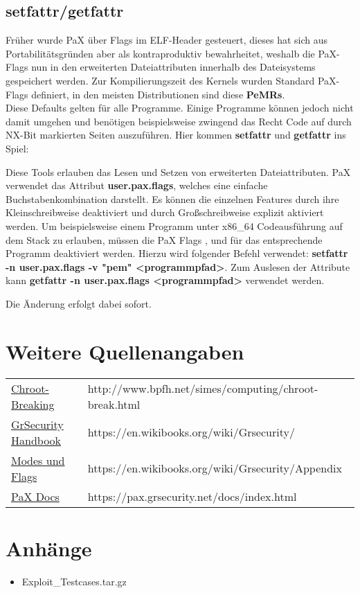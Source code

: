 \subsection{setfattr/getfattr}
\label{subsec:setfattr-getfattr}
Früher wurde PaX über Flags im ELF-Header gesteuert, dieses hat sich aus Portabilitätsgründen aber als kontraproduktiv bewahrheitet, weshalb die PaX-Flags nun in den erweiterten Dateiattributen innerhalb des Dateisystems gespeichert werden.
Zur Kompilierungszeit des Kernels wurden Standard PaX-Flags definiert, in den meisten Distributionen sind diese \textbf{PeMRs}.\\
Diese Defaults gelten für alle Programme. Einige Programme können jedoch nicht damit umgehen und benötigen beispielsweise zwingend das Recht Code auf durch NX-Bit markierten Seiten auszuführen. Hier kommen \textbf{setfattr} und \textbf{getfattr} ins Spiel:

Diese Tools erlauben das Lesen und Setzen von erweiterten Dateiattributen. PaX verwendet das Attribut \textbf{user.pax.flags}, welches eine einfache Buchstabenkombination darstellt. Es können die einzelnen Features durch ihre Kleinschreibweise deaktiviert und durch Großschreibweise explizit aktiviert werden. Um beispielsweise einem Programm unter x86\_64 Codeausführung auf dem Stack zu erlauben, müssen die PaX Flags ,  und  für das entsprechende Programm deaktiviert werden. Hierzu wird folgender Befehl verwendet: \textbf{setfattr -n user.pax.flags -v "pem" \textless programmpfad\textgreater}. Zum Auslesen der Attribute kann \textbf{getfattr -n user.pax.flags \textless programmpfad\textgreater} verwendet werden.

Die Änderung erfolgt dabei sofort.

\section{Weitere Quellenangaben}
\label{sec:Weitere Quellenangaben}

\begin{tabular}{ll}
\href{http://www.bpfh.net/simes/computing/chroot-break.html}{Chroot-Breaking} & http://www.bpfh.net/simes/computing/chroot-break.html\\
\href{https://en.wikibooks.org/wiki/Grsecurity/}{GrSecurity Handbook} & https://en.wikibooks.org/wiki/Grsecurity/\\
\href{https://en.wikibooks.org/wiki/Grsecurity/Appendix}{Modes und Flags} & https://en.wikibooks.org/wiki/Grsecurity/Appendix\\
\href{https://pax.grsecurity.net/docs/index.html}{PaX Docs} & https://pax.grsecurity.net/docs/index.html\\
\end{tabular}

\section{Anhänge}
\label{sec:Anhaenge}

\begin{itemize}
\item Exploit\_Testcases.tar.gz
\end{itemize}
